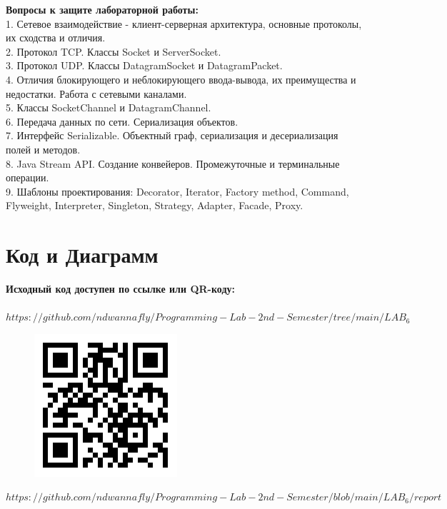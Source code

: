 \textbf{Вопросы к защите лабораторной работы:}\\
	1. Сетевое взаимодействие - клиент-серверная архитектура, основные протоколы, их сходства и отличия.\\
	2. Протокол TCP. Классы Socket и ServerSocket.\\
	3. Протокол UDP. Классы DatagramSocket и DatagramPacket.\\
	4. Отличия блокирующего и неблокирующего ввода-вывода, их преимущества и недостатки. Работа с сетевыми каналами.\\
	5. Классы SocketChannel и DatagramChannel.\\
	6. Передача данных по сети. Сериализация объектов.\\
	7. Интерфейс Serializable. Объектный граф, сериализация и десериализация полей и методов.\\
	8. Java Stream API. Создание конвейеров. Промежуточные и терминальные операции.\\
	9. Шаблоны проектирования: Decorator, Iterator, Factory method, Command, Flyweight, Interpreter, Singleton, Strategy, Adapter, Facade, Proxy.\\

\section{Код и Диаграмм}
\textbf{Исходный код доступен по ссылке или QR-коду:}\\
\\     
\underline{$https://github.com/ndwannafly/Programming-Lab-2nd-Semester/tree/main/LAB_6$}\\


\begin{figure}[H]
\includegraphics[scale=0.8]{img/SourceCode}
\label{pic:SourceCode}
\end{figure}

\underline{$https://github.com/ndwannafly/Programming-Lab-2nd-Semester/blob/main/LAB_6/report$}\\


